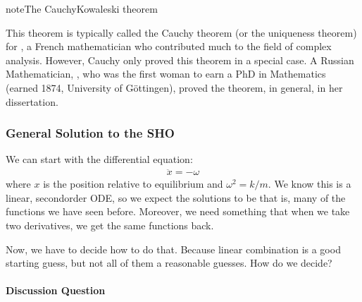 \documentclass[letterpaper,10pt,english]{jupyterBook}
\begin{document}
\begin{sphinxadmonition}{note}{The Cauchy\sphinxhyphen{}Kowaleski theorem }

\sphinxAtStartPar
This theorem is typically called the Cauchy theorem (or the uniqueness theorem) for , a French mathematician who contributed much to the field of complex analysis. However, Cauchy only proved this theorem in a special case.  A Russian Mathematician, , who was the first woman to earn a PhD in Mathematics (earned 1874, University of Göttingen), proved the theorem, in general, in her dissertation.

\sphinxAtStartPar
{}
\end{sphinxadmonition}


\subsubsection{General Solution to the SHO}
\label{\detokenize{content/2_oscillations/activity-SHO_and_dynamical_systems:general-solution-to-the-sho}}
\sphinxAtStartPar
We can start with the differential equation:
\begin{equation*}
\begin{split}\ddot{x} = -\omega\end{split}
\end{equation*}
\sphinxAtStartPar
where \(x\) is the position relative to equilibrium and \(\omega^2 = k/m\). We know this is a linear, second\sphinxhyphen{}order ODE, so we expect the solutions to be  \sphinxhyphen{} that is, many of the functions we have seen before. Moreover, we need something that when we take two derivatives, we get the same functions back.

\sphinxAtStartPar
{}

\sphinxAtStartPar
Now, we have to decide how to do that. Because  linear combination is a good starting guess, but not all of them a reasonable guesses. How do we decide?


\paragraph{Discussion Question}
\label{\detokenize{content/2_oscillations/activity-SHO_and_dynamical_systems:discussion-question}}
\sphinxAtStartPar
{}
\end{document}
